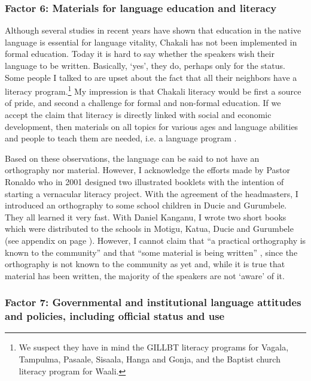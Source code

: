 \subsubsection{Factor 6: Materials for language education and literacy}
\label{sec:SOC-Factor6}

Although several studies in recent years have shown that education in the native
language is essential for language vitality, Chakali has not been implemented in
formal education.  Today it is hard to say whether the speakers wish their
language to be written.  Basically, `yes', they do, perhaps only for the status.
Some people I talked to are upset about the fact that all their neighbors have
a
literacy program.\footnote{We suspect they have in mind the GILLBT literacy
programs for Vagala, Tampulma, Pasaale, Sisaala, Hanga and Gonja, and the
Baptist church literacy program for Waali.} My impression  is that
Chakali
literacy
would be first a  source of pride, and second a challenge for formal and
non-formal education. If we accept the claim that literacy is directly linked
with  social and
economic development, then  materials on all topics for 
various ages
and language abilities and people to teach them  are needed, i.e. a language
program
\citep[see][7]{Gren06}. 


Based on these observations,   the language can be said to not have an
orthography nor material.  However, I acknowledge the efforts made by Pastor
Ronaldo who in 2001 designed two illustrated booklets with the intention of
starting a vernacular literacy project. With the agreement of the headmasters, I
 introduced an orthography to some school children in Ducie and Gurumbele. They
all learned it very fast. With Daniel Kanganu, I wrote two short books which
were distributed to the schools in Motigu, Katua, Ducie and Gurumbele (see
appendix on page \pageref{chap:TXT-text}). However, I  cannot claim that ``a
practical
orthography is known to the community'' and that ``some material is being
written''  \citep[12]{Reco03}, since the orthography is not known to the
community as yet and, while
it is true that material has been written, the majority of the speakers are not
`aware' of it. 




\subsubsection{ Factor 7: Governmental and institutional language attitudes
and policies, including official status and use}
\label{sec:SOC-Factor7}

